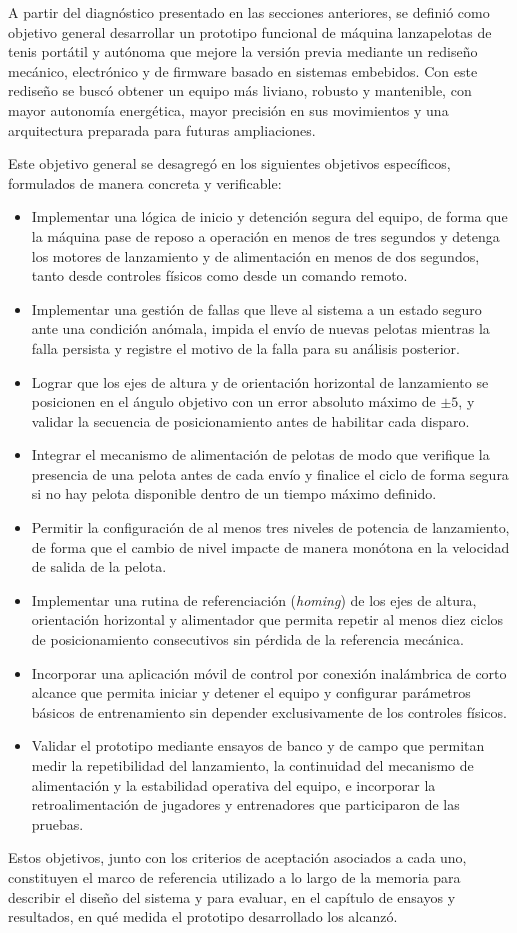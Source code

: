 A partir del diagnóstico presentado en las secciones anteriores, se definió como objetivo general desarrollar un prototipo funcional de máquina lanzapelotas de tenis portátil y autónoma que mejore la versión previa mediante un rediseño mecánico, electrónico y de firmware basado en sistemas embebidos. Con este rediseño se buscó obtener un equipo más liviano, robusto y mantenible, con mayor autonomía energética, mayor precisión en sus movimientos y una arquitectura preparada para futuras ampliaciones.

Este objetivo general se desagregó en los siguientes objetivos específicos, formulados de manera concreta y verificable:

\begin{itemize}
	\item Implementar una lógica de inicio y detención segura del equipo, de forma que la máquina pase de reposo a operación en menos de tres segundos y detenga los motores de lanzamiento y de alimentación en menos de dos segundos, tanto desde controles físicos como desde un comando remoto.
	\item Implementar una gestión de fallas que lleve al sistema a un estado seguro ante una condición anómala, impida el envío de nuevas pelotas mientras la falla persista y registre el motivo de la falla para su análisis posterior.
	\item Lograr que los ejes de altura y de orientación horizontal de lanzamiento se posicionen en el ángulo objetivo con un error absoluto máximo de $\pm 5$\grados{}, y validar la secuencia de posicionamiento antes de habilitar cada disparo.
	\item Integrar el mecanismo de alimentación de pelotas de modo que verifique la presencia de una pelota antes de cada envío y finalice el ciclo de forma segura si no hay pelota disponible dentro de un tiempo máximo definido.
	\item Permitir la configuración de al menos tres niveles de potencia de lanzamiento, de forma que el cambio de nivel impacte de manera monótona en la velocidad de salida de la pelota.
	\item Implementar una rutina de referenciación (\emph{homing}) de los ejes de altura, orientación horizontal y alimentador que permita repetir al menos diez ciclos de posicionamiento consecutivos sin pérdida de la referencia mecánica.
	\item Incorporar una aplicación móvil de control por conexión inalámbrica de corto alcance que permita iniciar y detener el equipo y configurar parámetros básicos de entrenamiento sin depender exclusivamente de los controles físicos.
	\item Validar el prototipo mediante ensayos de banco y de campo que permitan medir la repetibilidad del lanzamiento, la continuidad del mecanismo de alimentación y la estabilidad operativa del equipo, e incorporar la retroalimentación de jugadores y entrenadores que participaron de las pruebas.
\end{itemize}

Estos objetivos, junto con los criterios de aceptación asociados a cada uno, constituyen el marco de referencia utilizado a lo largo de la memoria para describir el diseño del sistema y para evaluar, en el capítulo de ensayos y resultados, en qué medida el prototipo desarrollado los alcanzó.
